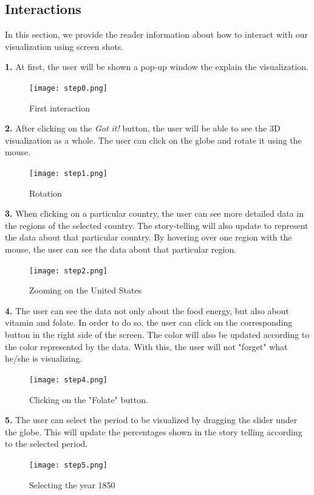 \documentclass[12pt]{article}
\begin{document}
\subsection{Interactions}
In this section, we provide the reader information about how to interact with our visualization using screen shots. \newline

\textbf{1.} At first, the user will be shown a pop-up window the explain the visualization.
\begin{figure}[h]
\centering
\texttt{[image: step0.png]}
\caption{First interaction}
\end{figure}

\textbf{2.} After clicking on the \textit{Got it!} button, the user will be able to see the 3D visualization as a whole. The user can click on the globe and rotate it using the mouse.
\begin{figure}[h]
\centering
\texttt{[image: step1.png]}
\caption{Rotation}
\end{figure} \newpage

\textbf{3.} When clicking on a particular country, the user can see more detailed data in the regions of the selected country. The story-telling will also update to represent the data about that particular country. By hovering over one region with the mouse, the user can see the data about that particular region.
\begin{figure}[h]
\centering
\texttt{[image: step2.png]}
\caption{Zooming on the United States}
\end{figure} 

\textbf{4.} The user can see the data not only about the food energy, but also about vitamin and folate. In order to do so, the user can click on the corresponding button in the right side of the screen. The color will also be updated according to the color represented by the data. With this, the user will not "forget" what he/she is visualizing.

\begin{figure}[h]
\centering
\texttt{[image: step4.png]}
\caption{Clicking on the "Folate" button.}
\end{figure} \newpage

\textbf{5.} The user can select the period to be visualized by dragging the slider under the globe. This will update the percentages shown in the story telling according to the selected period. 
\begin{figure}[h]
\centering
\texttt{[image: step5.png]}
\caption{Selecting the year 1850}
\end{figure} 
\end{document}
